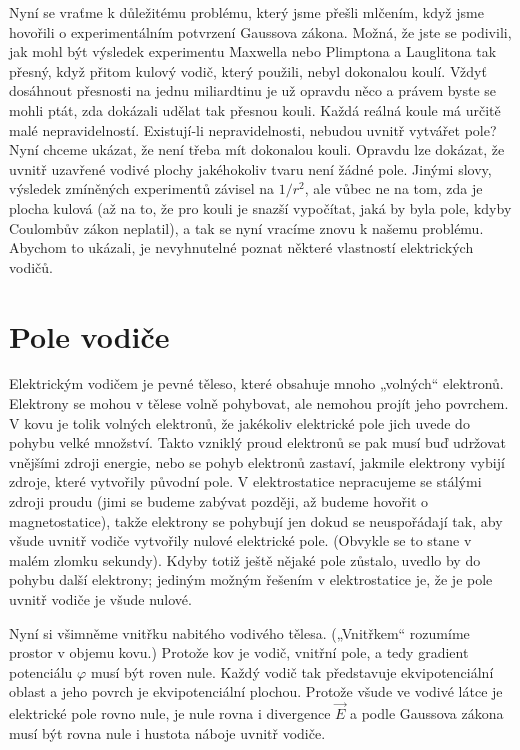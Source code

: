   Nyní se vraťme k důležitému problému, který jsme přešli mlčením, když jsme hovořili o 
  experimentálním potvrzení Gaussova zákona. Možná, že jste se podivili, jak mohl být výsledek 
  experimentu Maxwella nebo Plimptona a Lauglitona tak přesný, když přitom kulový vodič, který 
  použili, nebyl dokonalou koulí. Vždyť dosáhnout přesnosti na jednu miliardtinu je už opravdu 
  něco a právem byste se mohli ptát, zda dokázali udělat tak přesnou kouli. Každá reálná koule 
  má určitě malé nepravidelností. Existují-li nepravidelnosti, nebudou uvnitř vytvářet pole? 
  Nyní chceme ukázat, že není třeba mít dokonalou kouli. Opravdu lze dokázat, že uvnitř 
  uzavřené vodivé plochy jakéhokoliv tvaru není žádné pole. Jinými slovy, výsledek zmíněných 
  experimentů závisel na \(1/r^2\), ale vůbec ne na tom, zda je plocha kulová (až na to, že pro 
  kouli je snazší vypočítat, jaká by byla pole, kdyby Coulombův zákon neplatil), a tak se nyní 
  vracíme znovu k našemu problému. Abychom to ukázali, je nevyhnutelné poznat některé 
  vlastností elektrických vodičů.
  
\section{Pole vodiče}\label{fyz:IIchapVsecVIII}
  Elektrickým vodičem je pevné těleso, které obsahuje mnoho „volných“ elektronů. Elektrony se 
  mohou v tělese volně pohybovat, ale nemohou projít jeho povrchem. V kovu je tolik volných 
  elektronů, že jakékoliv elektrické pole jich uvede do pohybu velké množství. Takto vzniklý 
  proud elektronů se pak musí buď udržovat vnějšími zdroji energie, nebo se pohyb elektronů 
  zastaví, jakmile elektrony vybijí zdroje, které vytvořily původní pole. V elektrostatice 
  nepracujeme se stálými zdroji proudu (jimi se budeme zabývat později, až budeme hovořit o 
  magnetostatice), takže elektrony se pohybují jen dokud se neuspořádají tak, aby všude uvnitř 
  vodiče vytvořily nulové elektrické pole. (Obvykle se to stane v malém zlomku sekundy). Kdyby 
  totiž ještě nějaké pole zůstalo, uvedlo by do pohybu další elektrony; jediným možným řešením 
  v elektrostatice je, že je pole uvnitř vodiče je všude nulové.
  
  Nyní si všimněme vnitřku nabitého vodivého tělesa. („Vnitřkem“ rozumíme prostor v objemu 
  kovu.) Protože kov je vodič, vnitřní pole, a tedy gradient potenciálu \(\varphi\) musí být 
  roven nule. Každý vodič tak představuje ekvipotenciální oblast a jeho povrch je 
  ekvipotenciální plochou. Protože všude ve vodivé látce je elektrické pole rovno nule, je nule 
  rovna i divergence \(\vec{E}\) a podle Gaussova zákona musí být rovna nule i hustota náboje 
  uvnitř vodiče.

